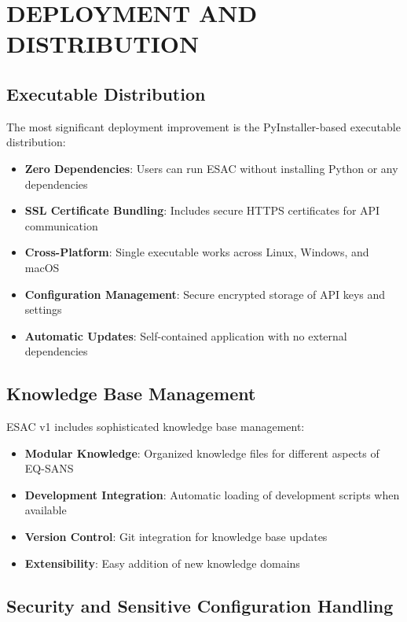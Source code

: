 \documentclass[tm]{ornltm} %
\begin{document}
\section{DEPLOYMENT AND DISTRIBUTION}
\label{sec:deployment}

\subsection{Executable Distribution}
\label{subsec:executable}

The most significant deployment improvement is the PyInstaller-based executable distribution:

\begin{itemize}
  \item \textbf{Zero Dependencies}: Users can run ESAC without installing Python or any dependencies
  \item \textbf{SSL Certificate Bundling}: Includes secure HTTPS certificates for API communication
  \item \textbf{Cross-Platform}: Single executable works across Linux, Windows, and macOS
  \item \textbf{Configuration Management}: Secure encrypted storage of API keys and settings
  \item \textbf{Automatic Updates}: Self-contained application with no external dependencies
\end{itemize}

\subsection{Knowledge Base Management}
\label{subsec:knowledge_management}

ESAC v1 includes sophisticated knowledge base management:

\begin{itemize}
  \item \textbf{Modular Knowledge}: Organized knowledge files for different aspects of EQ-SANS
  \item \textbf{Development Integration}: Automatic loading of development scripts when available
  \item \textbf{Version Control}: Git integration for knowledge base updates
  \item \textbf{Extensibility}: Easy addition of new knowledge domains
\end{itemize}

\subsection{Security and Sensitive Configuration Handling}
\label{subsec:security}
\end{document}
